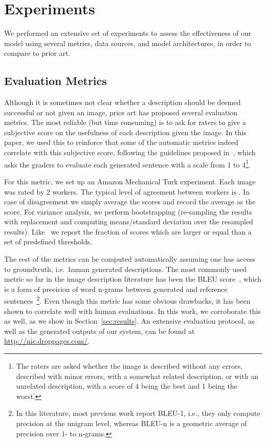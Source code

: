 \section{Experiments}
\label{sec:exps}
We performed an extensive set of experiments to assess the effectiveness of our
model using several metrics, data sources, and model architectures, in order
to compare to prior art.

\subsection{Evaluation Metrics}
Although it is sometimes not clear whether a description should be deemed
successful or not given an image,
prior art has proposed several evaluation metrics. The most
reliable (but time consuming) is to ask for raters to give a subjective score
on the usefulness of each description given the image. In this paper, we used
this to reinforce that some of the automatic metrics indeed correlate with this
subjective score, following the guidelines proposed
in~\cite{hodosh2013framing}, which asks the
graders to evaluate each generated sentence with a scale from 1 to 4\footnote{
The raters are asked whether the image is
described without any errors, described with minor errors, with a somewhat
related description, or with an unrelated description, with a score of 4 being
the best and 1 being the worst.}.

For this metric, we set up an Amazon Mechanical Turk experiment. Each image was
rated by 2 workers. The typical level of agreement between workers
is . In case of disagreement we simply average the scores and record the
average as the score. For variance analysis, we perform bootstrapping
(re-sampling the results with replacement and computing means/standard
deviation over the resampled results). Like~\cite{hodosh2013framing} we
report the fraction
of scores which are larger or equal than a set of predefined thresholds.

The rest of the metrics can be computed automatically assuming one has access to
groundtruth, i.e.~human generated descriptions. The most commonly used metric
so far in the image description literature has been the
BLEU score~\cite{papineni2002},
which is a form of precision of word n-grams between generated and reference
sentences~\footnote{In this literature, most previous work report BLEU-1, i.e., they only compute precision at the unigram level, whereas BLEU-n is a geometric average of precision over 1- to n-grams.}.
Even though this metric has some obvious drawbacks, it has been shown to correlate
well with human evaluations. In this work, we corroborate this as well, as
we show in Section~\ref{sec:results}. An extensive evaluation protocol, as well
as the generated outputs of our system, can be found at \url{http://nic.droppages.com/}.

